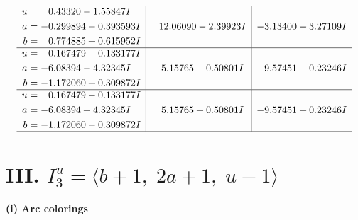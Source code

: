 \documentclass[1p]{elsarticle_modified}
\theoremstyle{definition}
\begin{document}
$$\begin{array}{c|c|c}
\begin{aligned}
u &= \phantom{-}0.43320 - 1.55847 I \\
a &= -0.299894 - 0.393593 I \\
b &= \phantom{-}0.774885 + 0.615952 I\end{aligned}
 & \phantom{-}12.06090 - 2.39923 I & -3.13400 + 3.27109 I \\ \hline\begin{aligned}
u &= \phantom{-}0.167479 + 0.133177 I \\
a &= -6.08394 - 4.32345 I \\
b &= -1.172060 + 0.309872 I\end{aligned}
 & \phantom{-}5.15765 - 0.50801 I & -9.57451 - 0.23246 I \\ \hline\begin{aligned}
u &= \phantom{-}0.167479 - 0.133177 I \\
a &= -6.08394 + 4.32345 I \\
b &= -1.172060 - 0.309872 I\end{aligned}
 & \phantom{-}5.15765 + 0.50801 I & -9.57451 + 0.23246 I\\
 \hline 
 \end{array}$$\newpage\newpage\renewcommand{\arraystretch}{1}
\centering \section*{III. $I^u_{3}= \langle b+1,\;2 a+1,\;u-1 \rangle$}
\flushleft \textbf{(i) Arc colorings}\\
\end{document}
